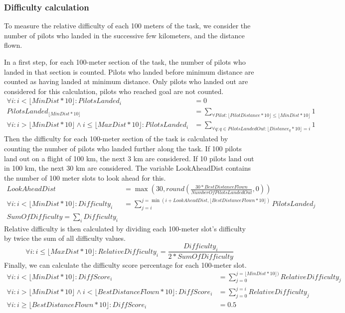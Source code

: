\documentclass{article}
\begin{document}
\subsubsection{Difficulty calculation}
\label{sec:difficulty-calculation}
\begin{hg}
To measure the relative difficulty of each 100 meters of the task, we consider
the number of pilots who landed in the successive few kilometers, and the
distance flown.

In a first step, for each 100-meter section of the task, the number of pilots
who landed in that section is counted. Pilots who landed before minimum
distance are counted as having landed at minimum distance. Only pilots who
landed out are considered for this calculation, pilots who reached goal are not
counted.
\begin{align*}
    \forall i : i < \lfloor MinDist * 10 \rfloor : PilotsLanded_i &= 0 \\
    PilotsLanded_{\lfloor MinDist * 10 \rfloor} &= \sum_{\forall Pilot : \lfloor PilotDistance * 10 \rfloor \leq \lfloor MinDist * 10 \rfloor} 1 \\
    \forall i : i > \lfloor MinDist * 10 \rfloor \land i \leq \lfloor MaxDist * 10 \rfloor : PilotsLanded_i &= \sum_{\forall q : q \in PilotsLandedOut : \lfloor Distance_q * 10 \rfloor = i} 1
\end{align*}
Then the difficulty for each 100-meter section of the task is calculated by
counting the number of pilots who landed further along the task. If 100 pilots
land out on a flight of 100 km, the next 3 km are considered. If 10 pilots land
out in 100 km, the next 30 km are considered. The variable LookAheadDist
contains the number of 100 meter slots to look ahead for this.
\begin{align*}
    LookAheadDist &= \max(30, round(\frac{30 * BestDistanceFlown}{NumberOfPilotsLandedOut}, 0)) \\
    \forall i : i < \lfloor MinDist * 10 \rfloor : Difficulty_i &= \sum_{j = i}^{j = \min(i + LookAheadDist, \lfloor BestDistanceFlown * 10 \rfloor)} PilotsLanded_j \\
    SumOfDifficulty = \sum_i Difficulty_i
\end{align*}
Relative difficulty is then calculated by dividing each 100-meter slot’s difficulty by twice the sum of all
difficulty values.
\[ \forall i : i \leq \lfloor MaxDist * 10 \rfloor : RelativeDifficulty_i = \frac{Difficulty_i}{2 * SumOfDifficulty} \]
Finally, we can calculate the difficulty score percentage for each 100-meter slot.
\begin{align*}
    \forall i : i < \lfloor MinDist * 10 \rfloor : DiffScore_i &= \sum_{j = 0}^{j = \lfloor MinDist * 10 \rfloor)} RelativeDifficulty_j \\
    \forall i : i > \lfloor MinDist * 10 \rfloor \land i < \lfloor BestDistanceFlown * 10 \rfloor : DiffScore_i &= \sum_{j = 0}^{j = i} RelativeDifficulty_j \\
    \forall i : i \geq \lfloor BestDistanceFlown * 10 \rfloor : DiffScore_i &= 0.5
\end{align*}
\end{hg}
\end{document}
